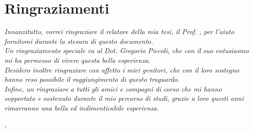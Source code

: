 
\cleardoublepage
{}
{}




\begingroup
\let\clearpage\relax
\let\cleardoublepage\relax
\let\cleardoublepage\relax

\chapter*{Ringraziamenti}

\noindent \textit{Innanzitutto, vorrei ringraziare il relatore della mia tesi, il Prof. \myProf, per l'aiuto fornitomi durante la stesura di questo documento.}\\

\noindent \textit{Un ringraziamento speciale va al Dot. Gregorio Piccoli, che con il suo entusiasmo mi ha permesso di vivere questa bella esperienza.}\\

\noindent \textit{Desidero inoltre ringraziare con affetto i miei genitori, che con il loro sostegno hanno reso possibile il raggiungimento di questo traguardo.}\\

\noindent \textit{Infine, un ringraziare a tutti gli amici e compagni di corso che mi hanno sopportato e sostenuto durante il mio percorso di studi, grazie a loro questi anni rimarranno una bella ed indimenticabile esperienza.}\\

\bigskip

\noindent\textit{\myLocation, \myTime}
\hfill \myName

\endgroup

